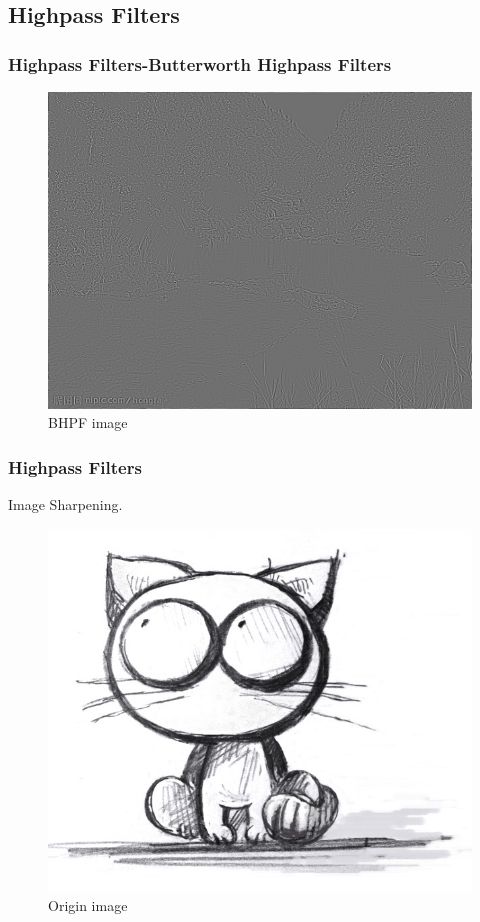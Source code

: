 \documentclass[notheorems, serif, table, compress]{beamer}  %
\begin{document}
\subsection{Highpass Filters}


\begin{frame}
\frametitle{Highpass Filters-Butterworth Highpass Filters}
\begin{figure}
 \centering
 \caption{BHPF image}
 \includegraphics[width=0.8\linewidth]{bhpf1.png} 
 \end{figure}
 \end{frame}

\begin{frame}
\frametitle{Highpass Filters}
Image Sharpening.%

\begin{figure}
 \centering
 \caption{Origin image}
 \includegraphics[width=0.8\linewidth]{horgn.png} 
 \end{figure}
 \end{frame}
\end{document}
